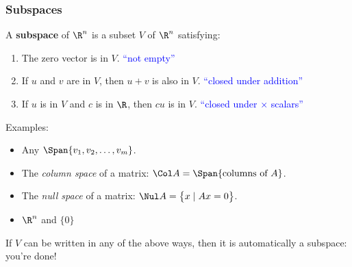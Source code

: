 
\begin{frame}
\frametitle{Subspaces}

\vskip-3mm
\begin{defn}
  A \textbf{subspace} of $\R^n$ is a subset $V$ of $\R^n$ satisfying:
  \begin{enumerate}
  \item The zero vector is in $V$.
    \hfill \textcolor{blue}{``not empty''}
  \item If $u$ and $v$ are in $V$, then $u+v$ is also in $V$.
    \hfill \textcolor{blue}{``closed under addition''}
  \item If $u$ is in $V$ and $c$ is in $\R$, then $cu$ is in $V$.
    \hfill \textcolor{blue}{``closed under $\times$ scalars''}
  \end{enumerate}
\end{defn}

\pause\bigskip
\alert{Examples:}
\begin{itemize}
\item Any $\Span\{v_1,v_2,\ldots,v_m\}$.
  \pause
\item The \emph{column space} of a matrix: 
  $\Col A = \Span\{\text{columns of $A$}\}$.
  \pause
\item The \emph{null space} of a matrix:
  $\Nul A = \bigl\{ x\mid Ax = 0 \bigr\}$.
  \pause
\item $\R^n$ and $\{0\}$
\end{itemize}

\pause\medskip
\begin{bluebox}{.9\linewidth}
  If $V$ can be written in any of the above ways, then it is automatically a
  subspace: you're done!
\end{bluebox}

\end{frame}



